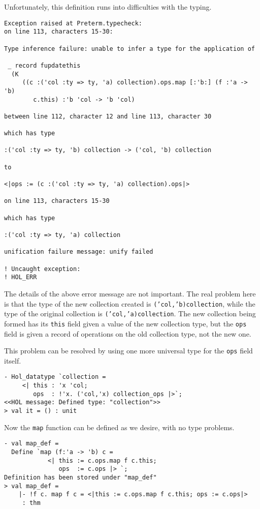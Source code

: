 Unfortunately, this definition runs into difficulties with the typing.
\begin{session}
\begin{verbatim}
Exception raised at Preterm.typecheck:
on line 113, characters 15-30:

Type inference failure: unable to infer a type for the application of

 _ record fupdatethis
  (K
     ((c :('col :ty => ty, 'a) collection).ops.map [:'b:] (f :'a -> 'b)
        c.this) :'b 'col -> 'b 'col)

between line 112, character 12 and line 113, character 30

which has type

:('col :ty => ty, 'b) collection -> ('col, 'b) collection

to

<|ops := (c :('col :ty => ty, 'a) collection).ops|>

on line 113, characters 15-30

which has type

:('col :ty => ty, 'a) collection

unification failure message: unify failed

! Uncaught exception:
! HOL_ERR
\end{verbatim}
\end{session}
The details of the above error message are not important.
The real problem here is that the type of the new collection created is
\texttt{('col,'b)collection}, while the type of the original collection is
\texttt{('col,'a)collection}. The new collection being formed has its
\texttt{this} field given a value of the new collection type,
but the \texttt{ops} field is given a record of operations on the old collection type,
not the new one.

This problem can be resolved by using one more universal type for the \texttt{ops}
field itself.
\begin{session}
\begin{verbatim}
- Hol_datatype `collection =
     <| this : 'x 'col;
        ops  : !'x. ('col,'x) collection_ops |>`;
<<HOL message: Defined type: "collection">>
> val it = () : unit
\end{verbatim}
\end{session}

Now the \texttt{map} function can be defined as we desire, with no type problems.
\begin{session}
\begin{verbatim}
- val map_def =
  Define `map (f:'a -> 'b) c =
            <| this := c.ops.map f c.this;
               ops  := c.ops |> `;
Definition has been stored under "map_def"
> val map_def =
    |- !f c. map f c = <|this := c.ops.map f c.this; ops := c.ops|>
     : thm
\end{verbatim}
\end{session}

